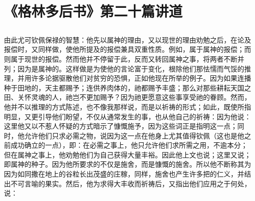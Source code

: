

\section{《格林多后书》第二十篇讲道}


\subsection{}

\par

由此尤可钦佩保禄的智慧：他先以属神的理由，又以现世的理由劝勉之后，在论及报偿时，又同样做，使他所提及的报偿兼具双重性质。例如，属于属神的报偿；而则属于现世的报偿。然而他并不停留于此，反而又转回属神之事，将两者不断并列；因为是属神的。这样做是为使他的言论富于变化，根除他们那怯懦而气馁的推理，并用许多论据驱散他们对贫穷的恐惧，正如他现在所举的例子。因为如果连播种于田地的，天主都赐予；连供养肉体的，祂都赐予丰盛；那么对那些耕耘天国之田、关怀灵魂的人，祂岂不更加赐予？因为祂更愿意这些事享受祂的眷顾。然而，他并不以推理的方式陈述，也不像我那样说，而是以祈祷的形式；如此，既使所指明显，又更引导他们盼望，不仅从通常发生的事，也从他自己的祈祷：因为他说：这里他又以不惹人怀疑的方式暗示了慷慨施予，因为这些词正是指明这一点；同时，他允许他们只求必需之物，说因为这一点在他身上尤其值得钦佩（这也是他之前成功确立的一点），即：在必需之事上，他只允许他们求所需之用，不逾本分；但在属神之事上，他劝勉他们为自己获得大量丰裕。因此他上文也说；这里又说；即属神的种子。因为他所要求的不仅是施舍，而是慷慨的施舍。所以他不断称其为因为如同撒在地上的谷粒长出茂盛的庄稼，同样，施舍也产生许多把的仁义，并结出不可言喻的果实。然后，他为求得大丰收而祈祷后，又指出他们应用之于何处，说：\par

